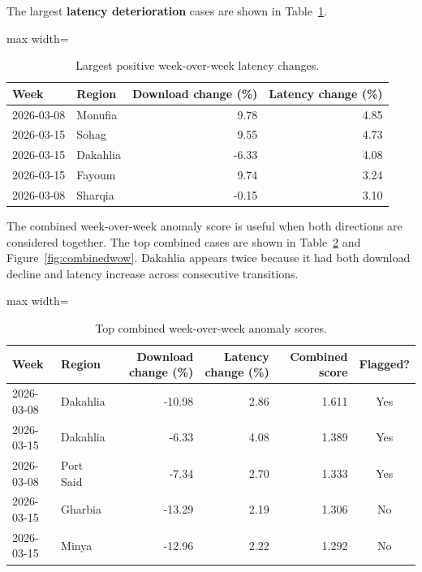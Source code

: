 \documentclass[12pt,a4paper]{article}
\begin{document}
The largest \textbf{latency deterioration} cases are shown in Table~\ref{tab:latchg}.

\begin{table}[htbp]
\centering
\small
\begin{adjustbox}{max width=\textwidth}
\begin{tabular}{l l r r}
\toprule
Week & Region & Download change (\%) & Latency change (\%) \\
\midrule
2026-03-08 & Monufia & 9.78 & 4.85 \\
2026-03-15 & Sohag & 9.55 & 4.73 \\
2026-03-15 & Dakahlia & -6.33 & 4.08 \\
2026-03-15 & Fayoum & 9.74 & 3.24 \\
2026-03-08 & Sharqia & -0.15 & 3.10 \\
\bottomrule
\end{tabular}
\end{adjustbox}
\caption{Largest positive week-over-week latency changes.}
\label{tab:latchg}
\end{table}

The combined week-over-week anomaly score is useful when both directions are considered together. The top combined cases are shown in Table~\ref{tab:combinedwow} and Figure~\ref{fig:combinedwow}. Dakahlia appears twice because it had both download decline and latency increase across consecutive transitions.

\begin{table}[htbp]
\centering
\small
\begin{adjustbox}{max width=\textwidth}
\begin{tabular}{l l r r r c}
\toprule
Week & Region & Download change (\%) & Latency change (\%) & Combined score & Flagged? \\
\midrule
2026-03-08 & Dakahlia & -10.98 & 2.86 & 1.611 & Yes \\
2026-03-15 & Dakahlia & -6.33 & 4.08 & 1.389 & Yes \\
2026-03-08 & Port Said & -7.34 & 2.70 & 1.333 & Yes \\
2026-03-15 & Gharbia & -13.29 & 2.19 & 1.306 & No \\
2026-03-15 & Minya & -12.96 & 2.22 & 1.292 & No \\
\bottomrule
\end{tabular}
\end{adjustbox}
\caption{Top combined week-over-week anomaly scores.}
\label{tab:combinedwow}
\end{table}
\end{document}
